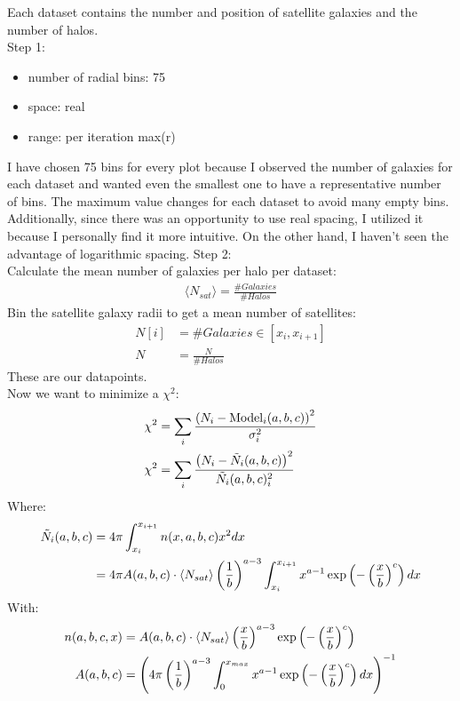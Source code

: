 Each dataset contains the number and position of satellite galaxies and the number of halos.\\
Step 1:\\
\begin{itemize}
    \item number of radial bins: 75
    \item space: real
    \item range: per iteration max(r)
\end{itemize}
I have chosen 75 bins for every plot because I observed the number of galaxies for each dataset and wanted even the smallest one to have a representative number of bins. The maximum value changes for each dataset to avoid many empty bins. Additionally, since there was an opportunity to use real spacing, I utilized it because I personally find it more intuitive. On the other hand, I haven't seen the advantage of logarithmic spacing.
Step 2: \\
Calculate the mean number of galaxies per halo per dataset:
\begin{align}
    \langle N_{sat} \rangle = \frac{\# Galaxies}{\# Halos}
\end{align}
Bin the satellite galaxy radii to get a mean number of satellites:
\begin{align}
    N[i] &= \# Galaxies \in [x_i,x_{i+1}]\\
    N &= \frac{N}{\# Halos}
\end{align}
These are our datapoints. \\
Now we want to minimize a $\chi^2$:
\begin{align}
    \chi^2 &= \sum_i \frac{\left({N_i-\text{Model}_i(a,b,c)}\right)^2}{\sigma_i^2}\\
    \chi^2 &= \sum_i \frac{\left({N_i-\Tilde{N}_i(a,b,c)}\right)^2}{\Tilde{N}_i(a,b,c)_i^2}
\end{align}
Where:
\begin{align}
    \Tilde{N}_i(a,b,c) &= 4 \pi \int_{x_i}^{x_{i+1}}n(x,a,b,c)x^2dx \\
    &= 4 \pi A(a,b,c)\cdot \langle N_{sat} \rangle \left( \frac{1}{b} \right)^{a-3}  \int_{x_i}^{x_{i+1}}x^{a-1} \exp\left({-\left( \frac{x}{b} \right)^{c}}\right) dx
\end{align}
With:
\begin{align}
    n(a,b,c,x) &= A(a,b,c)\cdot \langle N_{sat} \rangle \left( \frac{x}{b} \right)^{a-3} \exp\left({-\left( \frac{x}{b} \right)^{c}}\right)\\
    A(a,b,c) &= \left({4\pi \left( \frac{1}{b} \right)^{a-3} \int_0^{x_{max}} x^{a-1} \exp\left({-\left( \frac{x}{b} \right)^c}\right) dx}\right)^{-1}
\end{align}


